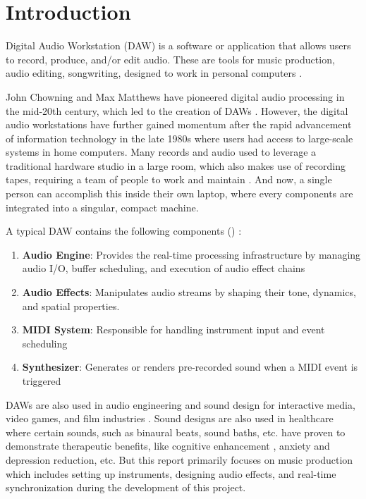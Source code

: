 \section{Introduction}

Digital Audio Workstation (DAW) is a software or application that allows users to record, 
produce, and/or edit audio. These are tools for music production, audio editing, songwriting,
designed to work in personal computers \cite{AlexU.Case2014DAW}. 

John Chowning and Max Matthews have pioneered digital audio processing in the mid-20th century, 
which led to the creation of DAWs \cite{avid2023daw}. However, the digital audio workstations have further
gained momentum after the rapid advancement of information technology in the late 1980s where users 
had access to large-scale systems in home computers. Many records and audio used to leverage a traditional 
hardware studio in a large room, which also makes use of recording tapes, requiring a team of people 
to work and maintain \cite{jones2024daw}. And now, a single person can accomplish this inside their own laptop,
where every components are integrated into a singular, compact machine.

A typical DAW contains the following components () \cite{anthropicclaude}:
\begin{enumerate}
    \item \textbf{Audio Engine}: Provides the real-time processing infrastructure by managing 
    audio I/O, buffer scheduling, and execution of audio effect chains \cite{portaudio}
    \item \textbf{Audio Effects}: Manipulates audio streams by shaping their tone, dynamics, and spatial properties. \cite{native_instruments_audio_effects} 
    \item \textbf{MIDI System}: Responsible for handling instrument input and event scheduling
    \item \textbf{Synthesizer}: Generates or renders pre-recorded sound when a MIDI event is triggered
\end{enumerate}

DAWs are also used in audio engineering and sound design for interactive media, video games, 
and film industries \cite{elwyn2023bestdaw}. Sound designs are also used in healthcare where certain sounds, such as 
binaural beats, sound baths, etc. have proven to demonstrate therapeutic 
benefits, like cognitive enhancement \cite{MuliaGabriellaJeanne2026Cetm}, anxiety and depression 
reduction, etc. But this report primarily focuses on music production
which includes setting up instruments, designing audio effects, and real-time synchronization during the 
development of this project.



